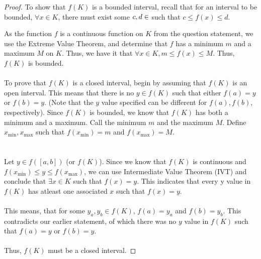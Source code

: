 \documentclass{article}
\theoremstyle{plain} %
\numberwithin{thm}{section} %
\theoremstyle{definition}
\begin{document}
    \begin{proof}
        To show that \(f(K)\) is a bounded interval, recall that for an interval to be bounded, \(\forall x\in K\), there must exist some \(c,d\in\real\) such that \(c\leq f(x)\leq d\).
        
        As the function \(f\) is a continuous function on \(K\) from the question statement, we use the Extreme Value Theorem, and determine that \(f\) has a minimum \(m\) and a maximum \(M\) on \(K\).
        Thus, we have it that \(\forall x \in K, m \leq f(x)\leq M\). Thus, \(f(K)\) is bounded.
        \\\\
        To prove that \(f(K)\) is a closed interval, begin by assuming that \(f(K)\) is an open interval.
        This means that there is no \(y\in f(K)\) such that either \(f(a) = y\) or \(f(b) = y\). (Note that the \(y\) value specified can be different for \(f(a),f(b)\), respectively).
        Since \(f(K)\) is bounded, we know that \(f(K)\) has both a minimum and a maximum. Call the minimum \(m\) and the maximum \(M\). Define \(x_\text{min}, x_\text{max}\) such that \(f(x_\text{min}) = m\) and \(f(x_\text{max}) = M\).\\
        \\\\
        Let \(y\in f(\left[a,b\right])\) (or \(f(K)\)). Since we know that \(f(K)\) is continuous and \(f(x_\text{min}) \leq y \leq f(x_\text{max})\), we can use Intermediate Value Theorem (IVT) and conclude that \(\exists x\in K\) such that \(f(x) = y\). This indicates that every y value in \(f(K)\) has atleast one associated \(x\) such that \(f(x) = y\).
        \\\\
        This means, that for some \(y_a, y_b \in f(K)\), \(f(a) = y_a\) and \(f(b) = y_b\). This contradicts our earlier statement, of which there was no \(y\) value in \(f(K)\) such that \(f(a) = y\) or \(f(b) = y\).
        \\\\
        Thus, \(f(K)\) must be a closed interval.
    \end{proof}
\end{document}
